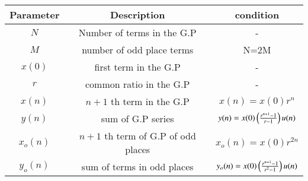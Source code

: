 
\begin{tabular}{|c|c|c|}
\hline
Parameter & Description & condition\\
\hline
\( N \) & Number of terms in the G.P & - \\
\hline
\( M \) & number of odd place terms & N=2M \\
\hline
\(x(0) \) & first term in the G.P & -\\
\hline
\( r \) & common ratio in the G.P & - \\
\hline
\( x(n) \) & $n+1$ th term in the G.P & $x(n)=x(0)r^{n}$\\
\hline
\( y(n) \) & sum of G.P series & $y(n)=x(0)\left(\frac{r^{n+1}-1}{r-1}\right)u(n)$\\
\hline
\( x_o(n) \) & $n+1$ th term of G.P of odd places & $x_o(n)= x(0)r^{2n}$\\
\hline
\( y_o(n) \) & sum of terms in odd places & $y_o(n)=x(0)\left(\frac{r^{n+1}-1}{r^2-1}\right)u(n)$\\
\hline
\end{tabular}



